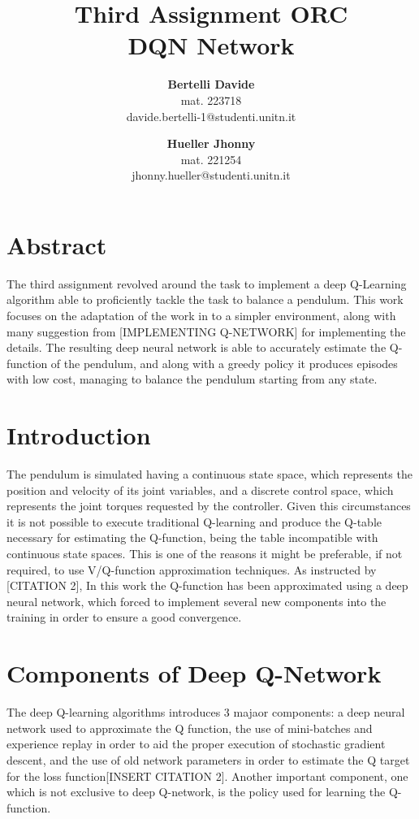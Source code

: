 \documentclass[twocolumn, a4paper]{article}
\begin{document}
\title{
	   \LARGE\textbf{Third Assignment ORC\\DQN Network}
	   \vspace{1cm}
	  }
\author{
		\textbf{Bertelli Davide} \\
		mat. 223718 \\
		davide.bertelli-1@studenti.unitn.it
		\and
		\textbf{Hueller Jhonny} \\
		mat. 221254\\
		jhonny.hueller@studenti.unitn.it
	   }
\date{}
\maketitle

\section{Abstract}
The third assignment revolved around the task to implement a deep Q-Learning
algorithm able to proficiently tackle the task to balance a pendulum.
This work focuses on the adaptation of the work in \cite{Mnih} to a simpler
environment, along with many suggestion from [IMPLEMENTING Q-NETWORK] for
implementing the details.
The resulting deep neural network is able to accurately estimate the Q-function
of the pendulum, and along with a greedy policy it produces episodes with
low cost, managing to balance the pendulum starting from any state.

\section{Introduction}
The pendulum is simulated having a continuous state space, which represents
the position and velocity of its joint variables, and a discrete control
space, which represents the joint torques requested by the controller.
Given this circumstances it is not possible to execute traditional Q-learning
and produce the Q-table necessary for estimating the Q-function, being the table
incompatible with continuous state spaces.
This is one of the reasons it might be preferable, if not required, to use
V/Q-function approximation techniques.
As instructed by [CITATION 2], In this work the Q-function has been approximated
using a deep neural network, which forced to implement several new components
into the training in order to ensure a good convergence.

\section{Components of Deep Q-Network}
The deep Q-learning algorithms introduces 3 majaor components: a deep neural network used to approximate the Q function, the use of mini-batches and experience replay in order to aid the proper execution of stochastic gradient descent, and the use of old network parameters in order to estimate the Q target for the loss function[INSERT CITATION 2].
Another important component, one which is not exclusive to deep Q-network, is the policy used for learning the Q-function.
\end{document}
